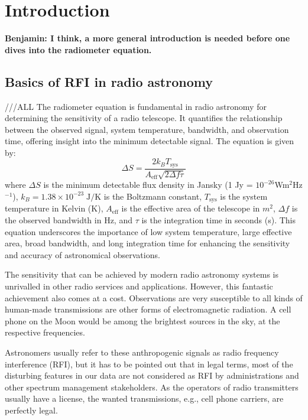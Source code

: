 \section{Introduction}
\label{section:hardware: introduction}

\textbf{Benjamin: I think, a more general introduction is needed before one dives into the radiometer equation.}

\subsection{Basics of RFI in radio astronomy} ///ALL
The radiometer equation is fundamental in radio astronomy for determining the sensitivity of a radio telescope. It quantifies the relationship between the observed signal, system temperature, bandwidth, and observation time, offering insight into the minimum detectable signal. The equation is given by:
\[ \Delta S = \frac{2 k_B T_{\text{sys}}}{A_{\text{eff}} \sqrt{2 \Delta f \tau}} \]
where \( \Delta S \) is the minimum detectable flux density in Jansky (1 Jy = $10^{-26}$Wm$^2$Hz$^{-1}$), \( k_B =1.38 \times 10^{-23} \;\text{J} / \text{K}\) is the Boltzmann constant, \( T_{\text{sys}} \) is the system temperature in Kelvin (K), \( A_{\text{eff}} \) is the effective area of the telescope in $m^2$, \( \Delta f \) is the observed bandwidth in Hz, and \( \tau \) is the integration time in seconds (s). This equation underscores the importance of low system temperature, large effective area, broad bandwidth, and long integration time for enhancing the sensitivity and accuracy of astronomical observations.

The sensitivity that can be achieved by modern radio astronomy systems is unrivalled in other radio services and applications. However, this fantastic achievement also comes at a cost. Observations are very susceptible to all kinds of human-made transmissions are other forms of electromagnetic radiation. A cell phone on the Moon would be among the brightest sources in the sky, at the respective frequencies. 

Astronomers usually refer to these anthropogenic signals as radio frequency interference (RFI), but it has to be pointed out that in legal terms, most of the disturbing features in our data are not considered as RFI by administrations and other spectrum management stakeholders. As the operators of radio transmitters usually have a license, the wanted transmissions, e.g., cell phone carriers, are perfectly legal. 

